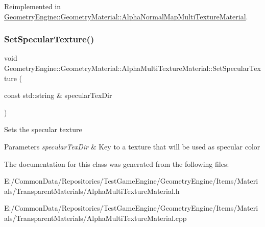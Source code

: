Reimplemented in \mbox{\hyperlink{class_geometry_engine_1_1_geometry_material_1_1_alpha_normal_map_multi_texture_material_a38d93e639375db048fc688c4a9848029}{Geometry\+Engine\+::\+Geometry\+Material\+::\+Alpha\+Normal\+Map\+Multi\+Texture\+Material}}.

\mbox{\label{class_geometry_engine_1_1_geometry_material_1_1_alpha_multi_texture_material_a31ee89561f985b0323397cffc4486262}} 
\subsubsection{\texorpdfstring{SetSpecularTexture()}{SetSpecularTexture()}}
{\footnotesize\ttfamily void Geometry\+Engine\+::\+Geometry\+Material\+::\+Alpha\+Multi\+Texture\+Material\+::\+Set\+Specular\+Texture (\begin{DoxyParamCaption}\item[{const std\+::string \&}]{specular\+Tex\+Dir }\end{DoxyParamCaption})}

Sets the specular texture 
\begin{DoxyParams}{Parameters}
{\em specular\+Tex\+Dir} & Key to a texture that will be used as specular color \\
\hline
\end{DoxyParams}


The documentation for this class was generated from the following files\+:\begin{DoxyCompactItemize}
\item 
E\+:/\+Common\+Data/\+Repositories/\+Test\+Game\+Engine/\+Geometry\+Engine/\+Items/\+Materials/\+Transparent\+Materials/Alpha\+Multi\+Texture\+Material.\+h\item 
E\+:/\+Common\+Data/\+Repositories/\+Test\+Game\+Engine/\+Geometry\+Engine/\+Items/\+Materials/\+Transparent\+Materials/Alpha\+Multi\+Texture\+Material.\+cpp\end{DoxyCompactItemize}
